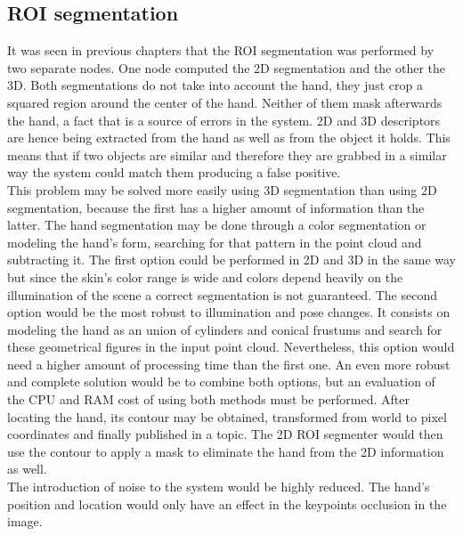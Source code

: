 	\subsection{ROI segmentation}

	It was seen in previous chapters that the ROI segmentation was performed by two separate nodes. 
	One node computed the 2D segmentation and the other the 3D. 
	Both segmentations do not take into account the hand, they just crop a squared region around the center of the hand. 
	Neither of them mask afterwards the hand, a fact that is a source of errors in the system. 
	2D and 3D descriptors are hence being extracted from the hand as well as from the object it holds. 
	This means that if two objects are similar and therefore they are grabbed in a similar way the system could match them producing a false positive. 
	\\

	This problem may be solved more easily using 3D segmentation than using 2D segmentation, because the first has a higher amount of information than the latter. 
	The hand segmentation may be done through a color segmentation or modeling the hand's form, searching for that pattern in the point cloud and subtracting it. 
	The first option could be performed in 2D and 3D in the same way but since the skin's color range is wide and colors depend heavily on the illumination of the scene a correct segmentation is not guaranteed.  
	The second option would be the most robust to illumination and pose changes. 
	It consists on modeling the hand as an union of cylinders and conical frustums and search for these geometrical figures in the input point cloud. 
	Nevertheless, this option would need a higher amount of processing time than the first one. 
	An even more robust and complete solution would be to combine both options, but an evaluation of the CPU and RAM cost of using both methods must be performed.
	After locating the hand, its contour may be obtained, transformed from world to pixel coordinates and finally published in a topic.
	The 2D ROI segmenter would then use the contour to apply a mask to eliminate the hand from the 2D information as well. 
	\\

	The introduction of noise to the system would be highly reduced.
	The hand's position and location would only have an effect in the keypoints occlusion in the image. 
	\\

